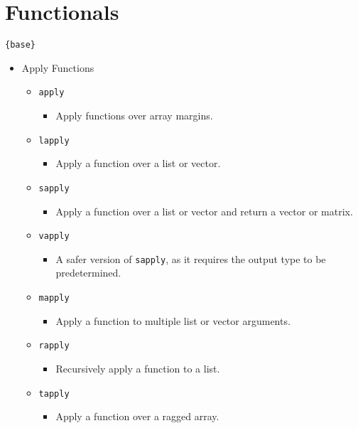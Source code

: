 \documentclass[
]{book}
\providecommand{\tightlist}{%
  \setlength{\itemsep}{0pt}\setlength{\parskip}{0pt}}
\begin{document}
\hypertarget{functionals}{%
\section{Functionals}\label{functionals}}

\texttt{\{base\}}

\begin{itemize}
\tightlist
\item
  Apply Functions

  \begin{itemize}
  \tightlist
  \item
    \texttt{apply}

    \begin{itemize}
    \tightlist
    \item
      Apply functions over array margins.
    \end{itemize}
  \item
    \texttt{lapply}

    \begin{itemize}
    \tightlist
    \item
      Apply a function over a list or vector.
    \end{itemize}
  \item
    \texttt{sapply}

    \begin{itemize}
    \tightlist
    \item
      Apply a function over a list or vector and return a vector or matrix.
    \end{itemize}
  \item
    \texttt{vapply}

    \begin{itemize}
    \tightlist
    \item
      A safer version of \texttt{sapply}, as it requires the output type to be predetermined.
    \end{itemize}
  \item
    \texttt{mapply}

    \begin{itemize}
    \tightlist
    \item
      Apply a function to multiple list or vector arguments.
    \end{itemize}
  \item
    \texttt{rapply}

    \begin{itemize}
    \tightlist
    \item
      Recursively apply a function to a list.
    \end{itemize}
  \item
    \texttt{tapply}

    \begin{itemize}
    \tightlist
    \item
      Apply a function over a ragged array.
    \end{itemize}
  \end{itemize}
\end{itemize}
\end{document}
